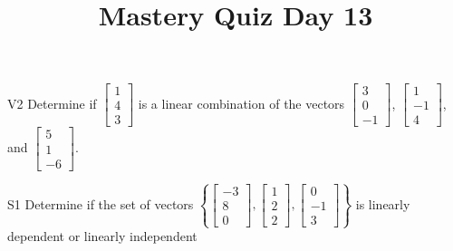 \documentclass{sbgLAquiz}
\title{Mastery Quiz Day 13 }
\begin{document}
\begin{problem}{V2} Determine if $\begin{bmatrix} 1 \\ 4 \\ 3 \end{bmatrix}$ is a linear combination of the vectors $\begin{bmatrix} 3 \\ 0 \\ -1 \end{bmatrix}$, $\begin{bmatrix} 1 \\ -1 \\ 4 \end{bmatrix}$, and $\begin{bmatrix} 5 \\ 1 \\  -6 \end{bmatrix}$.
\end{problem}

\begin{problem}{S1}
Determine if the set of vectors $\left\{ \begin{bmatrix} -3 \\ 8 \\ 0 \end{bmatrix}, \begin{bmatrix} 1 \\ 2 \\ 2 \end{bmatrix}, \begin{bmatrix} 0 \\ -1 \\ 3 \end{bmatrix} \right\}$ is  linearly dependent or linearly independent
\end{problem}
\end{document}
